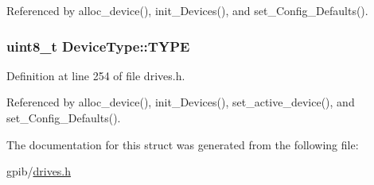 Referenced by alloc\+\_\+device(), init\+\_\+\+Devices(), and set\+\_\+\+Config\+\_\+\+Defaults().

\subsubsection[{\texorpdfstring{T\+Y\+PE}{TYPE}}]{\setlength{\rightskip}{0pt plus 5cm}uint8\+\_\+t Device\+Type\+::\+T\+Y\+PE}\hypertarget{structDeviceType_acee5219162b6f47a9423b2086d127ede}{}\label{structDeviceType_acee5219162b6f47a9423b2086d127ede}


Definition at line 254 of file drives.\+h.



Referenced by alloc\+\_\+device(), init\+\_\+\+Devices(), set\+\_\+active\+\_\+device(), and set\+\_\+\+Config\+\_\+\+Defaults().



The documentation for this struct was generated from the following file\+:\begin{DoxyCompactItemize}
\item 
gpib/\hyperlink{drives_8h}{drives.\+h}\end{DoxyCompactItemize}
